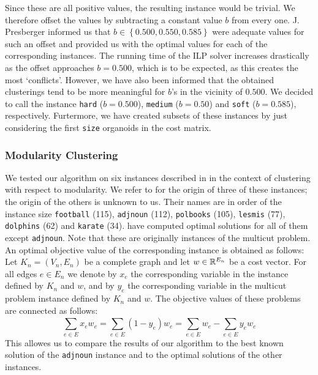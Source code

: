 Since these are all positive values, the resulting \CP instance would be trivial.
We therefore offset the values by subtracting a constant value $b$ from every one.
J. Presberger informed us that $b \in \left\{ 0.500, 0.550, 0.585 \right\}$ were adequate values for such an offset and provided us with the optimal values for each of the corresponding instances.
The running time of the ILP solver increases drastically as the offset approaches $b = 0.500$, which is to be expected, as this creates the most ‘conflicts’.
However, we have also been informed that the obtained clusterings tend to be more meaningful for $b$’s in the vicinity of $0.500$.
We decided to call the instance \texttt{hard} ($b= 0.500$), \texttt{medium} ($b = 0.50$) and \texttt{soft} ($b = 0.585$), respectively.
Furtermore, we have created subsets of these instances by just considering the first \texttt{size} organoids in the cost matrix.

\subsubsection{Modularity Clustering}
We tested our algorithm on six instances described in \cite{kappesComparativeStudyModern2015} in the context of clustering with respect to modularity.
We refer to \cite{brandesModularityClustering2008} for the origin of three of these instances; the origin of the others is unknown to us.
Their names are in order of the instance size \texttt{football} (115), \texttt{adjnoun} (112), \texttt{polbooks} (105), \texttt{lesmis} (77), \texttt{dolphins} (62) and \texttt{karate} (34).
\cite{kappesComparativeStudyModern2015} have computed optimal solutions for all of them except \texttt{adjnoun}.
Note that these are originally instances of the multicut problem.
An optimal objective value of the corresponding \CP instance is obtained as follows:
Let $K_{n} = (V_{n}, E_{n})$ be a complete graph and let $w \in \mathbb{R}^{E_{n}}$ be a cost vector.
For all edges $e \in E_{n}$ we denote by $x_{e}$ the corresponding variable in the \CP instance defined by $K_{n}$ and $w$, and by $y_{e}$ the corresponding variable in the multicut problem instance defined by $K_{n}$ and $w$.
The objective values of these problems are connected as follows:
\[
	\sum_{e \in E} x_{e} w_{e} = \sum_{e \in E}^{} (1-y_{e}) w_{e} = \sum_{e \in E}^{} w_{e} - \sum_{e \in E}^{} y_{e} w_{e}
\]
This allowes us to compare the results of our algorithm to the best known solution of the \texttt{adjnoun} instance and to the optimal solutions of the other instances. 


